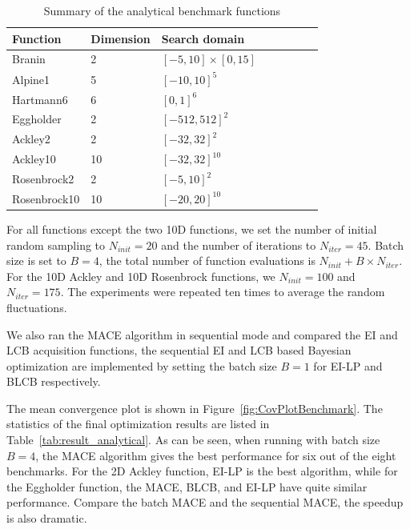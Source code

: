 \begin{table}[htbp]
    \centering
    \caption{Summary of the analytical benchmark functions}
    \label{tab:summaryanalygical}
    \begin{tabular}{llllllll}
        \toprule
         Function           & Dimension        & Search domain             \\ \midrule
         Branin             & 2                & $[-5,  10]\times[0, 15]$  \\
         Alpine1            & 5                & $[-10, 10]^5$             \\
         Hartmann6          & 6                & $[0,   1]^6$              \\
         Eggholder          & 2                & $[-512, 512]^2$           \\
         Ackley2            & 2                & $[-32, 32]^2$             \\
         Ackley10           & 10               & $[-32, 32]^{10}$          \\
         Rosenbrock2        & 2                & $[-5,  10]^2$             \\
         Rosenbrock10       & 10               & $[-20, 20]^{10}$          \\
        \bottomrule
    \end{tabular}
\end{table}

For all functions except the two 10D functions, we set the number of initial
random sampling to $N_{init} = 20$ and the number of iterations to $N_{iter} =
45$. Batch size is set to $B = 4$, the total number of function evaluations is
$N_{init} + B \times N_{iter}$. For the 10D Ackley and 10D Rosenbrock functions, we
$N_{init} = 100$ and $N_{iter} = 175$. The experiments were repeated ten
times to average the random fluctuations. 

We also ran the MACE algorithm in sequential mode and compared the EI and LCB
acquisition functions, the sequential EI and LCB based Bayesian optimization
are implemented by setting the batch size $B = 1$ for EI-LP and BLCB
respectively.

The mean convergence plot is shown in Figure~\ref{fig:CovPlotBenchmark}. The
statistics of the final optimization results are listed in
Table~\ref{tab:result_analytical}. As can be seen, when running with batch size
$B = 4$, the MACE algorithm gives the best performance for six out of the eight
benchmarks.  For the 2D Ackley function, EI-LP is the best algorithm, while for
the Eggholder function, the MACE, BLCB, and EI-LP have quite similar
performance.  Compare the batch MACE and the sequential MACE, the speedup is
also dramatic.

